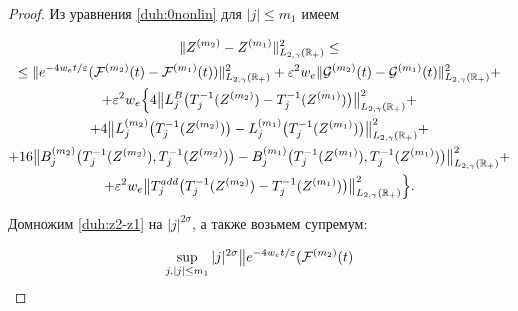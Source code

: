 \smallskip



\begin{proof} Из уравнения \eqref{duh:0nonlin} для $|j|\le m_1$ имеем

\begin{multline}

\|Z^{(m_2)}-Z^{(m_1)}\|^2_{L_{2,\gamma}(\mathbb R_{+})}\le

\\

\le

\| e^{-4w_e t/\varepsilon}( {\cal F}^{(m_2)}(t)

-{\cal F}^{(m_1)}(t))\|^2_{L_{2,\gamma}(\mathbb R_{+})}+

\varepsilon^2 w_e \|{\cal G}^{(m_2)}(t)-{\cal G}^{(m_1)}(t)\|^2_{L_{2,\gamma}(\mathbb R_{+})}+

\\

+\varepsilon^2 w_e \Bigl\{4

\bigl\|L_j^B \bigl(T_j^{-1}(Z^{(m_2)})-T_j^{-1}(Z^{(m_1)})\bigr)\bigr\|^2_{L_{2,\gamma}(\mathbb R_{+})}+

\\

+4

\bigl\|L^{(m_2)}_j\bigl(T_j^{-1}(Z^{(m_2)})\bigr)-L^{(m_1)}_j\bigl(T_j^{-1}(Z^{(m_1)})\bigr)\bigr\|^2_{L_{2,\gamma}(\mathbb R_{+})}+

\\

+16\bigl\|B^{(m_2)}_j \bigl(T_j^{-1}(Z^{(m_2)}), T_j^{-1}(Z^{(m_2)})\bigr)-

B^{(m_1)}_j\bigl(T_j^{-1}(Z^{(m_1)}), T_j^{-1}(Z^{(m_1)})\bigr)\bigr\|^2_{L_{2,\gamma}(\mathbb R_{+})}+

\\

+\varepsilon^2 w_e \bigl\|T^{add}_j \bigl(T_j^{-1}(Z^{(m_2)})-T_j^{-1}(Z^{(m_1)})\bigr)\bigr\|^2_{L_{2,\gamma}(\mathbb R_{+})} \Bigr\}.

\label{duh:z2-z1}

\end{multline}

Домножим  \eqref{duh:z2-z1} на $|j|^{2\sigma}$, а также возьмем супремум:

\begin{multline*}

\sup_{j, |j|\le m_1} |j|^{2\sigma} 

\bigl

\| e^{-4w_et/\varepsilon }( {\cal F}^{(m_2)}(t)


\end{multline*}
\end{proof}
